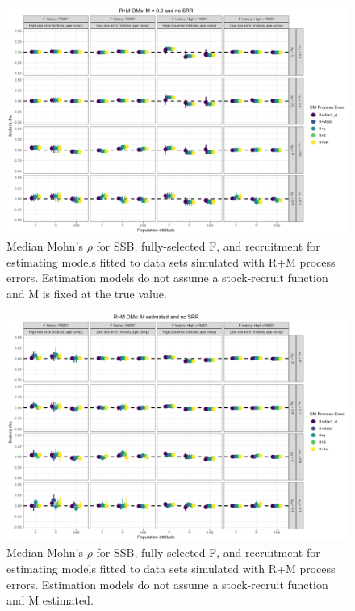 \documentclass[
  12pt,
]{article}
\begin{document}
\begin{landscape}
\begin{figure}
\caption{Median Mohn's $\rho$ for SSB, fully-selected F, and recruitment for estimating models fitted to data sets simulated with R+M process errors.  Estimation models do not assume a stock-recruit function and M is fixed at the true value.}\label{M_om_em_R_MF_mohns_rho}
\begin{center}
\includegraphics[width = \textwidth]{M_om_mohns_rho_R_MF.png}
\end{center}
\end{figure}
\end{landscape}

\begin{landscape}
\begin{figure}
\caption{Median Mohn's $\rho$ for SSB, fully-selected F, and recruitment for estimating models fitted to data sets simulated with R+M process errors.  Estimation models do not assume a stock-recruit function and M estimated.}\label{M_om_em_R_ME_mohns_rho}
\begin{center}
\includegraphics[width = \textwidth]{M_om_mohns_rho_R_ME.png}
\end{center}
\end{figure}
\end{landscape}
\end{document}
